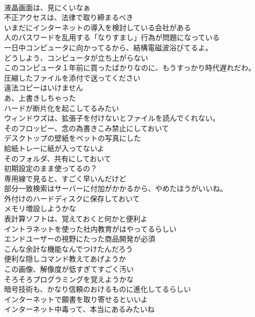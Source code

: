 \documentclass[8pt]{extreport}
\begin{document}
\begin{CJK}{UTF8}{min}
\\	液晶画面は、見にくいなぁ	
\\	不正アクセスは、法律で取り締まるべき	
\\	いまだにインターネットの導入を検討している会社がある	
\\	人のパスワードを乱用する「なりすまし」行為が問題になっている	
\\	一日中コンピュータに向かってるから、結構電磁波浴びてるよ。	
\\	どうしよう、コンピュータが立ち上がらない	
\\	このコンピュータ１年前に買ったばかりなのに、もうすっかり時代遅れだわ。	
\\	圧縮したファイルを添付で送ってください	
\\	違法コピーはいけません	
\\	あ、上書きしちゃった	
\\	ハードが断片化を起こしてるみたい	
\\	ウィンドウズは、拡張子を付けないとファイルを読んでくれない。	
\\	そのフロッピー、念の為書きこみ禁止にしておいて	
\\	デスクトップの壁紙をペットの写真にした	
\\	給紙トレーに紙が入ってないよ	
\\	そのフォルダ、共有にしておいて	
\\	初期設定のまま使ってるの？	
\\	専用線で見ると、すごく早いんだけど	
\\	部分一致検索はサーバーに付加がかかるから、やめたほうがいいね。	
\\	外付けのハードディスクに保存しておいて	
\\	メモリ増設しようかな	
\\	表計算ソフトは、覚えておくと何かと便利よ	
\\	イントラネットを使った社内教育がはやってるらしい	
\\	エンドユーザーの視野にたった商品開発が必須	
\\	こんな余計な機能なんでつけたんだろう	
\\	便利な隠しコマンド教えてあげようか	
\\	この画像、解像度が低すぎてすごく汚い	
\\	そろそろプログラミングを覚えようかな	
\\	暗号技術も、かなり信頼のおけるものに進化してるらしい	
\\	インターネットで願書を取り寄せるといいよ	
\\	インターネット中毒って、本当にあるみたいね	

\end{CJK}
\end{document}
